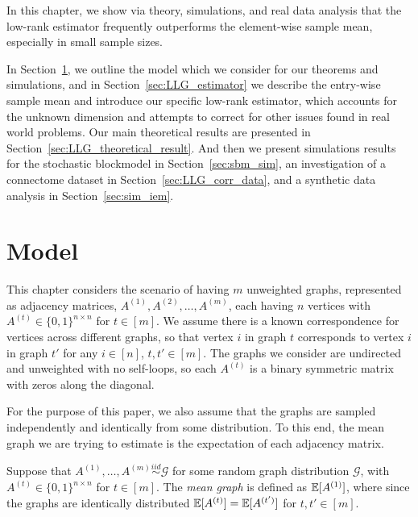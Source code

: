 In this chapter, we show via theory, simulations, and real data analysis that the low-rank estimator frequently outperforms the element-wise sample mean, especially in small sample sizes.


In Section~\ref{sec:LLG_model}, we outline the model which we consider for our theorems and simulations, and in Section~\ref{sec:LLG_estimator} we describe the entry-wise sample mean and introduce our specific low-rank estimator, which accounts for the unknown dimension and attempts to correct for other issues found in real world problems.
Our main theoretical results are presented in Section~\ref{sec:LLG_theoretical_result}. And then we present simulations results for the stochastic blockmodel in Section~\ref{sec:sbm_sim}, an investigation of a connectome dataset in Section~\ref{sec:LLG_corr_data}, and a synthetic data analysis in Section~\ref{sec:sim_iem}.






\section{Model}
\label{sec:LLG_model}

This chapter considers the scenario of having $m$ unweighted graphs, represented as adjacency matrices, $A^{(1)},A^{(2)},\dotsc,A^{(m)}$, each having $n$ vertices with $A^{(t)}\in\{0,1\}^{n \times n}$ for $t \in [m]$.
We assume there is a known correspondence for vertices across different graphs, so that vertex $i$ in graph $t$ corresponds to vertex $i$ in graph $t'$ for any $i \in [n]$, $t, t' \in [m]$.
The graphs we consider are undirected and unweighted with no self-loops, so each $A^{(t)}$ is a binary symmetric matrix with zeros along the diagonal. 

For the purpose of this paper, we also assume that the graphs are sampled independently and identically from some distribution.
To this end, the mean graph we are trying to estimate is the expectation of each adjacency matrix.
\begin{definition}
\label{def:mean_graph}
Suppose that $A^{(1)},\dotsc,A^{(m)}\stackrel{iid}{\sim} \mathcal{G}$ for some random graph distribution $\mathcal{G}$, with $A^{(t)}\in\{0,1\}^{n \times n}$ for $t \in [m]$.
The {\em mean graph} is defined as $\mathbb{E}[A^{(1)}]$, where since the graphs are identically distributed $\mathbb{E}[A^{(t)}]=\mathbb{E}[A^{(t')}]$ for $t, t' \in [m]$.
\end{definition}

